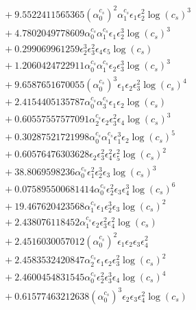 \documentclass[10pt]{article}
\begin{document}
\begin{align*}
&{}  + 9.5522411565365 \left(\alpha_{0}^{c_s}\right)^{2} \alpha_{1}^{c_s} \epsilon_{1} \epsilon_{2}^{2} \log{\left(c_{s} \right)}^{3} \\
&{}  + 4.7802049778609 \alpha_{0}^{c_s} \alpha_{1}^{c_s} \epsilon_{1} \epsilon_{2}^{3} \log{\left(c_{s} \right)}^{3} \\
&{}  + 0.299069961259 \epsilon_{2}^{3} \epsilon_{3}^{2} \epsilon_{4} \epsilon_{5} \log{\left(c_{s} \right)} \\
&{}  + 1.2060424722911 \alpha_{0}^{c_s} \alpha_{1}^{c_s} \epsilon_{2} \epsilon_{3}^{3} \log{\left(c_{s} \right)}^{3} \\
&{}  + 9.6587651670055 \left(\alpha_{0}^{c_s}\right)^{3} \epsilon_{1} \epsilon_{2} \epsilon_{3}^{2} \log{\left(c_{s} \right)}^{4} \\
&{}  + 2.4154405135787 \alpha_{0}^{c_s} \alpha_{3}^{c_s} \epsilon_{1} \epsilon_{2} \log{\left(c_{s} \right)} \\
&{}  + 0.60557557577091 \alpha_{2}^{c_s} \epsilon_{2} \epsilon_{3}^{2} \epsilon_{4} \log{\left(c_{s} \right)}^{3} \\
&{}  + 0.30287521721998 \alpha_{0}^{c_s} \alpha_{1}^{c_s} \epsilon_{1}^{3} \epsilon_{2} \log{\left(c_{s} \right)}^{5} \\
&{}  + 0.60576476303628 \epsilon_{2} \epsilon_{3}^{2} \epsilon_{4}^{2} \epsilon_{5}^{2} \log{\left(c_{s} \right)}^{2} \\
&{}  + 38.8069598236 \alpha_{0}^{c_s} \epsilon_{1}^{2} \epsilon_{2}^{3} \epsilon_{3} \log{\left(c_{s} \right)}^{3} \\
&{}  + 0.075895500681414 \alpha_{0}^{c_s} \epsilon_{2}^{2} \epsilon_{3} \epsilon_{4}^{3} \log{\left(c_{s} \right)}^{6} \\
&{}  + 19.467620423568 \alpha_{1}^{c_s} \epsilon_{1} \epsilon_{2}^{3} \epsilon_{3} \log{\left(c_{s} \right)}^{2} \\
&{}  + 2.438076118452 \alpha_{1}^{c_s} \epsilon_{2} \epsilon_{3}^{2} \epsilon_{4}^{2} \log{\left(c_{s} \right)} \\
&{}  + 2.4516030057012 \left(\alpha_{0}^{c_s}\right)^{2} \epsilon_{1} \epsilon_{2} \epsilon_{3} \epsilon_{4}^{2} \\
&{}  + 2.4583532420847 \alpha_{2}^{c_s} \epsilon_{1} \epsilon_{2} \epsilon_{3}^{2} \log{\left(c_{s} \right)}^{2} \\
&{}  + 2.4600454831545 \alpha_{0}^{c_s} \epsilon_{2}^{2} \epsilon_{3}^{3} \epsilon_{4} \log{\left(c_{s} \right)}^{4} \\
&{}  + 0.61577463212638 \left(\alpha_{0}^{c_s}\right)^{3} \epsilon_{2} \epsilon_{3} \epsilon_{4}^{2} \log{\left(c_{s} \right)} \\

\end{align*}
\end{document}
